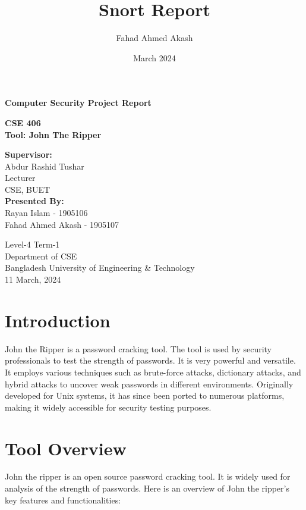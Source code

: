 \documentclass[12pt, A4Paper]{article}
\title{Snort Report}
\author{Fahad Ahmed Akash}
\date{March 2024}
\begin{document}
\begin{titlepage}
   \begin{center}

       \LARGE{\textbf{Computer Security Project Report}}

       \vspace{1cm}
       \Large{\textbf{CSE 406}}\\
       \vspace{0.5cm}
       \large{\textbf {Tool: John The Ripper}}
       
        \vspace{2cm}
    \textbf{Supervisor:}\\
       Abdur Rashid Tushar\\
       Lecturer\\
       CSE, BUET\\
       
       
      \vspace{3cm}
    \textbf{Presented By:}\\
       Rayan Islam - 1905106\\
       Fahad Ahmed Akash - 1905107
            
       \vspace{2cm}
        Level-4 Term-1\\
        Department of CSE\\
       Bangladesh University of Engineering \& Technology\\
       11 March, 2024\\
            
   \end{center}
\end{titlepage}



\tableofcontents

\newpage

\section{Introduction}
John the Ripper is a password cracking tool. The tool is used by security professionals to test the strength of passwords. It is very powerful and versatile. It employs various techniques such as brute-force attacks, dictionary attacks, and hybrid attacks to uncover weak passwords in different environments. Originally developed for Unix systems, it has since been ported to numerous platforms, making it widely accessible for security testing purposes.

\section{Tool Overview}
John the ripper is an open source password cracking tool. It is widely used for analysis of the strength of passwords. Here is an overview of John the ripper's key features and functionalities:
\end{document}
